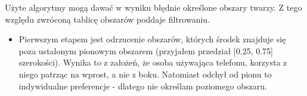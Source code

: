 \documentclass[10pt, a4paper]{article}
\begin{document}
Użyte algorytmy mogą dawać w wyniku błędnie określone obszary twarzy. Z tego względu zwróconą tablicę obszarów poddaje filtrowaniu.
\begin{itemize}
    \item Pierwszym etapem jest odrzucenie obszarów, których środek znajduje się poza ustalonym pionowym obszarem (przyjałem przedział [0.25, 0.75] szerokości). Wynika to z założeń, że osoba używająca telefonu, korzysta z niego patrząc na wprost, a nie z boku. Natomiast odchył od pionu to indywidualne preferencje - dlatego nie określam poziomego obszaru.

    \begin{figure}[H]
        \begin{center}
            \hspace{8mm}

\end{center}
\end{figure}
\end{itemize}
\end{document}
